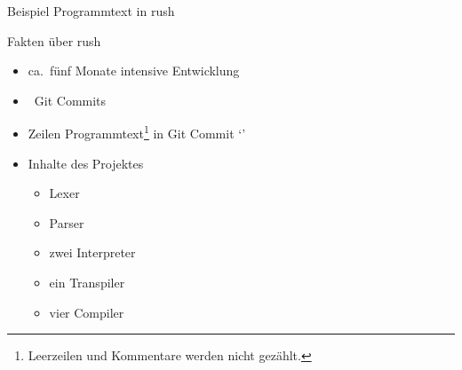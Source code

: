 \begin{frame}{Beispiel Programmtext in rush}
	\center
	\begin{minipage}{.95\textwidth}
	\end{minipage}
\end{frame}

\begin{frame}{Fakten über rush}
	\begin{itemize}
        \item ca.\ fünf Monate intensive Entwicklung
        \item \rushCountCommits~Git Commits
		\item {} Zeilen Programmtext\footnote{Leerzeilen und Kommentare werden nicht gezählt.} in Git Commit `\rushCommit'
		\item Inhalte des Projektes
            \begin{itemize}
                \item Lexer
                \item Parser
                \item zwei Interpreter
                \item ein Transpiler
                \item vier Compiler
            \end{itemize}
	\end{itemize}
\end{frame}

